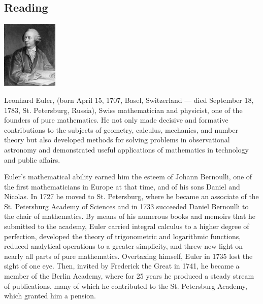 


\subsection*{Reading}
\begin{center}
  \includegraphics[width=0.2\textwidth]{euler}
\end{center}
Leonhard Euler, (born April 15, 1707, Basel, Switzerland --- died September 18, 1783, St. Petersburg, Russia), Swiss mathematician and physicist, one of the founders of pure mathematics. He not only made decisive and formative contributions to the subjects of geometry, calculus, mechanics, and number theory but also developed methods for solving problems in observational astronomy and demonstrated useful applications of mathematics in technology and public affairs.

Euler’s mathematical ability earned him the esteem of Johann Bernoulli, one of the first mathematicians in Europe at that time, and of his sons Daniel and Nicolas. In 1727 he moved to St. Petersburg, where he became an associate of the St. Petersburg Academy of Sciences and in 1733 succeeded Daniel Bernoulli to the chair of mathematics. By means of his numerous books and memoirs that he submitted to the academy, Euler carried integral calculus to a higher degree of perfection, developed the theory of trigonometric and logarithmic functions, reduced analytical operations to a greater simplicity, and threw new light on nearly all parts of pure mathematics. Overtaxing himself, Euler in 1735 lost the sight of one eye. Then, invited by Frederick the Great in 1741, he became a member of the Berlin Academy, where for 25 years he produced a steady stream of publications, many of which he contributed to the St. Petersburg Academy, which granted him a pension.

